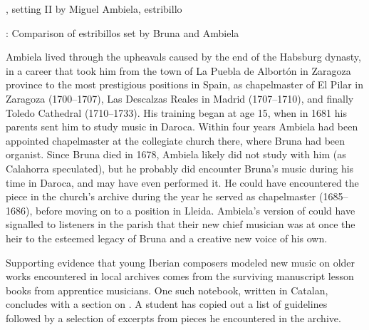 
\begin{poemexample}
    \caption{, setting II by Miguel Ambiela,
    estribillo} 
    \label{poem:Suban-2-estribillo}
\end{poemexample}

\begin{table}
    \caption{: Comparison of estribillos set by Bruna
    and Ambiela} 
    \label{tab:Bruna-Ambiela-cf}
\end{table}

Ambiela lived through the upheavals caused by the end of the Habsburg dynasty,
in a career that took him from the town of La Puebla de Albortón in Zaragoza
province to the most prestigious positions in Spain, as chapelmaster of El
Pilar in Zaragoza (1700--1707), Las Descalzas Reales in Madrid (1707--1710),
and finally Toledo Cathedral (1710--1733).%
    \Autocites
    [1]{Calahorra:Suban}
    []{Grove}
    {Alvarez:Ambiela}
His training began at age 15, when in 1681 his parents sent him to study music
in Daroca.
Within four years Ambiela had been appointed chapelmaster at the collegiate
church there, where Bruna had been organist.
Since Bruna died in 1678, Ambiela likely did not study with him (as Calahorra
speculated), but he probably did encounter Bruna's music during his time in
Daroca, and may have even performed it.%
    \Autocite{Calahorra:Suban}
He could have encountered the piece in the church's archive during the year he
served as chapelmaster (1685--1686), before moving on to a position in Lleida.
Ambiela's version of  could have signalled to listeners
in the parish that their new chief musician was at once the heir to the
esteemed legacy of Bruna and a creative new voice of his own.


Supporting evidence that young Iberian composers modeled new music on older
works encountered in local archives comes from the surviving manuscript lesson
books from apprentice musicians.
One such notebook, written in Catalan, concludes with a section on .%
    \Autocite{Cpt-Notes-Girona}
A student has copied out a list of guidelines followed by a selection of
excerpts from pieces he encountered in the archive.

